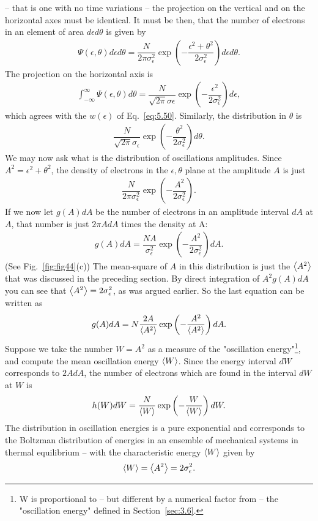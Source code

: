  -- that is one with no time variations -- the projection on the vertical and on the horizontal
 axes must be identical. It must be then, that the number of electrons in an element of area $d\epsilon d\theta$ is given by
\begin{align} \label{eq:5.57}
	\Psi(\epsilon,\theta)d\epsilon d\theta = \dfrac{N}{2\pi \sigma_\epsilon^2} \exp\left( -\dfrac{\epsilon^2 + \theta^2}{2\sigma_\epsilon^2} \right) d\epsilon d\theta.
\end{align}
The projection on the horizontal axis is
\begin{align}
	\int_{-\infty}^{\infty} \Psi(\epsilon,\theta) d\theta = \dfrac{N}{\sqrt{2\pi} \sigma\epsilon} \exp\left( -\dfrac{\epsilon^2}{2\sigma_\epsilon^2} \right) d\epsilon,
\end{align}
which agrees with the $w(\epsilon)$ of Eq.~\eqref{eq:5.50}. Similarly, the distribution in $\theta$ is
\begin{align}
	\dfrac{N}{\sqrt{2\pi} \sigma_\epsilon} \exp\left( -\dfrac{\theta^2}{2\sigma_\epsilon^2} \right) d\theta.
\end{align}
We may now ask what is the distribution of oscillations amplitudes. Since $A^2 = \epsilon^2 + \theta^2$, the density of electrons in the $\epsilon,\theta$ plane at the amplitude $A$ is just
\begin{align}
	\dfrac{N}{2\pi \sigma_\epsilon^2} \exp\left( -\dfrac{A^2}{2\sigma_\epsilon^2} \right).
\end{align}
If we now let $g(A)dA$ be the number of electrons in an amplitude interval $dA$ at $A$, that number is just $2\pi A dA$ times the density at A:
\begin{align}
	g(A) dA = \dfrac{N A}{\sigma_\epsilon^2} \exp\left( -\dfrac{A^2}{2\sigma_\epsilon^2} \right) dA.
\end{align}
(See Fig.~\ref{fig:fig44}(c)) The mean-square of $A$ in this distribution is just the $\left< A^2 \right>$ that was discussed in the preceding section. By direct integration of $A^2 g(A) dA$ you can see that $\left< A^2 \right> = 2\sigma_\epsilon^2$, as was argued earlier. So the last equation can be written as
\begin{align}
	g(A) dA = N \dfrac{2 A}{\left< A^2 \right>} \exp\left( -\dfrac{A^2}{\left< A^2 \right>} \right) dA.
\end{align}
Suppose we take the number $W = A^2$ as a measure of the "oscillation energy"\footnote{W is proportional to -- but different by a numerical factor from -- the "oscillation energy" defined in Section~\ref{sec:3.6}.}, and compute the mean oscillation energy $\left< W \right>$. Since the energy interval $dW$ corresponds to $2AdA$, the number of electrons which are found in the interval
 $dW$ at $W$ is
\begin{align} \label{eq:5.62}
	h(W)dW = \dfrac{N}{\left< W \right>}\exp\left( -\dfrac{W}{\left< W \right>} \right) dW.
\end{align}
The distribution
 in oscillation energies is a pure exponential and corresponds to the Boltzman distribution of energies in an ensemble of mechanical systems in thermal equilibrium -- with the characteristic
 energy $\left< W \right>$ given by
\begin{align}
	\left< W \right> = \left< A^2 \right> = 2 \sigma_\epsilon^2.
\end{align}
 
 
 
